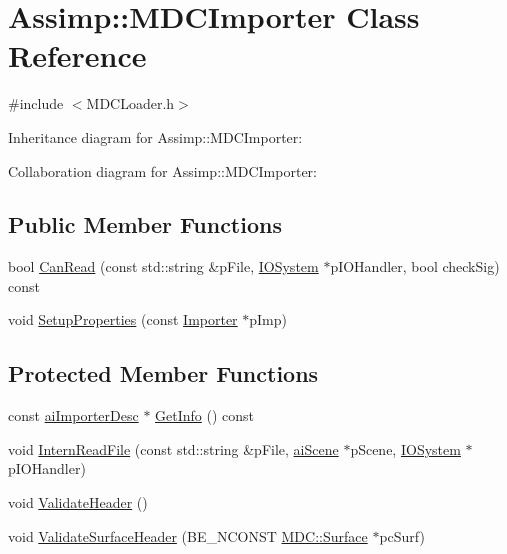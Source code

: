 \hypertarget{class_assimp_1_1_m_d_c_importer}{\section{Assimp\+:\+:M\+D\+C\+Importer Class Reference}
\label{class_assimp_1_1_m_d_c_importer}
}


{\ttfamily \#include $<$M\+D\+C\+Loader.\+h$>$}



Inheritance diagram for Assimp\+:\+:M\+D\+C\+Importer\+:


Collaboration diagram for Assimp\+:\+:M\+D\+C\+Importer\+:
\subsection*{Public Member Functions}
\begin{DoxyCompactItemize}
\item 
bool \hyperlink{class_assimp_1_1_m_d_c_importer_a17e835174f1d042ba894d8c54d735909}{Can\+Read} (const std\+::string \&p\+File, \hyperlink{class_assimp_1_1_i_o_system}{I\+O\+System} $\ast$p\+I\+O\+Handler, bool check\+Sig) const 
\item 
void \hyperlink{class_assimp_1_1_m_d_c_importer_ae95d077ab7d3da0740d96861649a75c7}{Setup\+Properties} (const \hyperlink{class_assimp_1_1_importer}{Importer} $\ast$p\+Imp)
\end{DoxyCompactItemize}
\subsection*{Protected Member Functions}
\begin{DoxyCompactItemize}
\item 
const \hyperlink{structai_importer_desc}{ai\+Importer\+Desc} $\ast$ \hyperlink{class_assimp_1_1_m_d_c_importer_aa80ee247ecebd1d43adb12195df73567}{Get\+Info} () const 
\item 
void \hyperlink{class_assimp_1_1_m_d_c_importer_ab88c5bf33072f70f042cdbd6b35cd25a}{Intern\+Read\+File} (const std\+::string \&p\+File, \hyperlink{structai_scene}{ai\+Scene} $\ast$p\+Scene, \hyperlink{class_assimp_1_1_i_o_system}{I\+O\+System} $\ast$p\+I\+O\+Handler)
\item 
void \hyperlink{class_assimp_1_1_m_d_c_importer_a35b6aedd709f58764fe10a923ba0a802}{Validate\+Header} ()
\item 
void \hyperlink{class_assimp_1_1_m_d_c_importer_a039d5ac068f7bca0b5c7987129708b03}{Validate\+Surface\+Header} (B\+E\+\_\+\+N\+C\+O\+N\+S\+T \hyperlink{struct_assimp_1_1_m_d_c_1_1_surface}{M\+D\+C\+::\+Surface} $\ast$pc\+Surf)
\end{DoxyCompactItemize}
